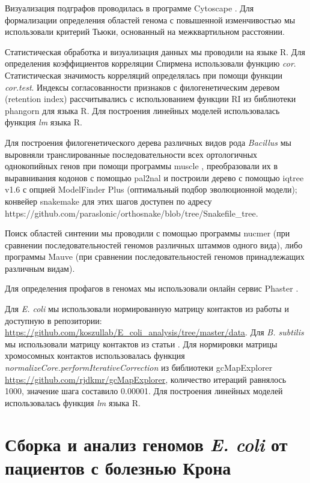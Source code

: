 Визуализация подграфов проводилась в программе Cytoscape \cite{smoot2011cytoscape}. Для формализации определения областей генома с повышенной изменчивостью мы использовали критерий Тьюки, основанный на межквартильном расстоянии.

Статистическая обработка и визуализация данных мы проводили на языке R. Для определения коэффициентов корреляции Спирмена использовали функцию \textit{cor}. Статистическая значимость корреляций определялась при помощи функции \textit{cor.test}. Индексы согласованности признаков с филогенетическим деревом (retention index) рассчитывались с использованием функции RI из библиотеки phangorn для языка R. Для построения линейных моделей использовалась функция \textit{lm} языка R.

Для построения филогенетического дерева различных видов рода \textit{Bacillus} мы выровняли транслированные последовательности всех ортологичных однокопийных генов при помощи программы muscle \cite{edgar2004muscle}, преобразовали их в выравнивания кодонов с помощью pal2nal и построили дерево с помощью iqtree v1.6 \cite{nguyen2015iq} с опцией ModelFinder Plus (оптимальный подбор эволюционной модели); конвейер snakemake для этих шагов доступен по адресу https://github.com/paraslonic/orthosnake/blob/tree/Snakefile\_tree. 

Поиск областей синтении мы проводили с помощью программы nucmer \cite{marccais2018mummer4}(при сравнении последовательностей геномов различных штаммов одного вида), либо программы Mauve \cite{darling2004mauve} (при сравнении последовательностей геномов принадлежащих различным видам).

Для определения профагов в геномах мы использовали онлайн сервис Phaster \cite{arndt2016phaster}. 

Для \textit{E. coli} мы использовали нормированную матрицу контактов из работы \cite{lioy2018multiscale} и доступную в репозитории: \url{https://github.com/koszullab/E_coli_analysis/tree/master/data}. Для \textit{B. subtilis} мы использовали матрицу контактов из статьи \cite{marbouty2015condensin}. Для нормировки матрицы хромосомных контактов использовалась функция  \textit{normalizeCore.performIterativeCorrection} из библиотеки gcMapExplorer \url{https://github.com/rjdkmr/gcMapExplorer}, количество итераций равнялось 1000, значение шага составило 0.00001. Для построения линейных моделей использовалась функция \textit{lm} языка R.

\section{Сборка и анализ геномов \textit{E. coli} от пациентов с болезнью Крона}

